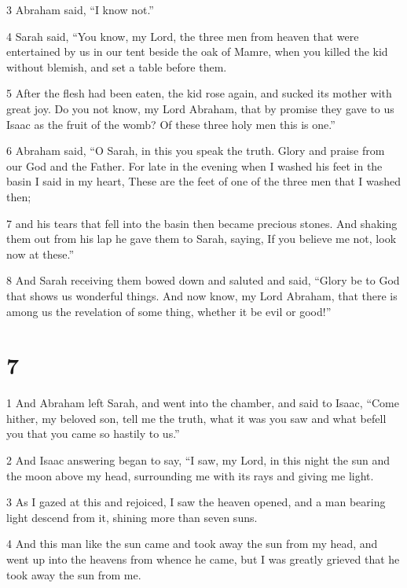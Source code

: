 \par 3 Abraham said, “I know not.” 

\par 4 Sarah said, “You know, my Lord, the three men from heaven that were entertained by us in our tent beside the oak of Mamre, when you killed the kid without blemish, and set a table before them. 

\par 5 After the flesh had been eaten, the kid rose again, and sucked its mother with great joy. Do you not know, my Lord Abraham, that by promise they gave to us Isaac as the fruit of the womb? Of these three holy men this is one.” 

\par 6 Abraham said, “O Sarah, in this you speak the truth. Glory and praise from our God and the Father. For late in the evening when I washed his feet in the basin I said in my heart, These are the feet of one of the three men that I washed then; 

\par 7 and his tears that fell into the basin then became precious stones. And shaking them out from his lap he gave them to Sarah, saying, If you believe me not, look now at these.” 

\par 8 And Sarah receiving them bowed down and saluted and said, “Glory be to God that shows us wonderful things. And now know, my Lord Abraham, that there is among us the revelation of some thing, whether it be evil or good!”


\chapter{7}

\par 1 And Abraham left Sarah, and went into the chamber, and said to Isaac, “Come hither, my beloved son, tell me the truth, what it was you saw and what befell you that you came so hastily to us.” 

\par 2 And Isaac answering began to say, “I saw, my Lord, in this night the sun and the moon above my head, surrounding me with its rays and giving me light. 

\par 3 As I gazed at this and rejoiced, I saw the heaven opened, and a man bearing light descend from it, shining more than seven suns. 

\par 4 And this man like the sun came and took away the sun from my head, and went up into the heavens from whence he came, but I was greatly grieved that he took away the sun from me. 

